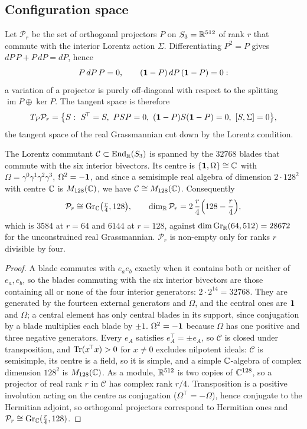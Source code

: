 \subsection{Configuration space}

Let $\mathcal P_r$ be the set of orthogonal projectors $P$ on $S_3=\mathbb{R}^{512}$ of rank $r$ that commute with the interior Lorentz
action $\Sigma$. Differentiating $P^2=P$ gives $dP\,P+P\,dP=dP$, hence
\[
P\,dP\,P=0,\qquad (\mathbf 1-P)\,dP\,(\mathbf 1-P)=0 :
\]
a variation of a projector is purely off-diagonal with respect to the splitting $\operatorname{im}P\oplus\ker P$. The tangent space
is therefore
\[
T_P\mathcal P_r=\bigl\{S:\ S^{\!\top}=S,\ PSP=0,\ (\id-P)S(\id-P)=0,\ [S,\Sigma]=0\bigr\},
\]
the tangent space of the real Grassmannian cut down by the Lorentz condition.

\begin{proposition}
\label{prop:config}
The Lorentz commutant $\mathcal C\subset\operatorname{End}_{\mathbb{R}}(S_3)$ is spanned by the $32768$ blades that commute with the six interior
bivectors. Its centre is $\{\mathbf 1,\Omega\}\cong\mathbb{C}$ with $\Omega=\gamma^0\gamma^1\gamma^2\gamma^3$, $\Omega^2=-\mathbf 1$, and since a
semisimple real algebra of dimension $2\cdot128^2$ with centre $\mathbb{C}$ is $M_{128}(\mathbb{C})$, we have $\mathcal C\cong M_{128}(\mathbb{C})$.
Consequently
\[
\mathcal P_r\cong\mathrm{Gr}_{\mathbb{C}}\bigl(\tfrac r4,128\bigr),\qquad
\dim_{\mathbb{R}}\mathcal P_r=2\,\frac r4\Bigl(128-\frac r4\Bigr),
\]
which is $3584$ at $r=64$ and $6144$ at $r=128$, against $\dim\mathrm{Gr}_{\mathbb{R}}(64,512)=28672$ for the unconstrained real Grassmannian. $\mathcal P_r$ is
non-empty only for ranks $r$ divisible by four.
\end{proposition}

\begin{proof}
A blade commutes with $e_ae_b$ exactly when it contains both or neither of $e_a,e_b$, so the blades commuting with the six interior bivectors are those
containing all or none of the four interior generators: $2\cdot2^{14}=32768$. They are generated by the fourteen external generators and $\Omega$, and the
central ones are $\mathbf 1$ and $\Omega$; a central element has only central blades in its support, since conjugation by a blade multiplies each blade by $\pm1$.
$\Omega^2=-\mathbf 1$ because $\Omega$ has one positive and three negative generators. Every $e_A$ satisfies $e_A^{\!\top}=\pm e_A$, so $\mathcal C$ is closed under
transposition, and $\operatorname{Tr}(x^{\!\top}x)>0$ for $x\neq0$ excludes nilpotent ideals: $\mathcal C$ is semisimple, its centre is a field, so it is simple, and a
simple $\mathbb{C}$-algebra of complex dimension $128^2$ is $M_{128}(\mathbb{C})$. As a module, $\mathbb{R}^{512}$ is two copies of $\mathbb{C}^{128}$, so a projector of real rank $r$ in
$\mathcal C$ has complex rank $r/4$. Transposition is a positive involution acting on the centre as conjugation ($\Omega^{\!\top}=-\Omega$), hence conjugate
to the Hermitian adjoint, so orthogonal projectors correspond to Hermitian ones and $\mathcal P_r\cong\mathrm{Gr}_{\mathbb{C}}(\tfrac r4,128)$.
\end{proof}

